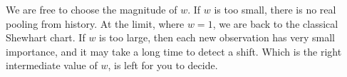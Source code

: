 

We are free to choose the magnitude of $w$. 
If $w$ is too small, there is no real pooling from history. At the limit, where $w=1$, we are back to the classical Shewhart chart. 
If $w$ is too large, then each new observation has very small importance, and it may take a long time to detect a shift.
Which is the right intermediate value of $w$, is left for you to decide.






